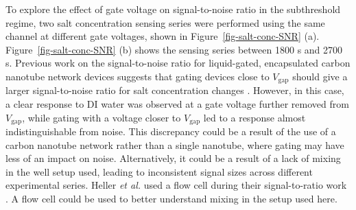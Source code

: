 \documentclass[
  a4paper,
]{scrbook}
\begin{document}
To explore the effect of gate voltage on signal-to-noise ratio in the
subthreshold regime, two salt concentration sensing series were
performed using the same channel at different gate voltages, shown in
Figure~\ref{fig-salt-conc-SNR} (a). Figure~\ref{fig-salt-conc-SNR} (b)
shows the sensing series between 1800 s and 2700 s. Previous work on the
signal-to-noise ratio for liquid-gated, encapsulated carbon nanotube
network devices suggests that gating devices close to
\(V_{\textrm{gap}}\) should give a larger signal-to-noise ratio for salt
concentration changes \autocite{Heller2009}. However, in this case, a
clear response to DI water was observed at a gate voltage further
removed from \(V_{\textrm{gap}}\), while gating with a voltage closer to
\(V_{\textrm{gap}}\) led to a response almost indistinguishable from
noise. This discrepancy could be a result of the use of a carbon
nanotube network rather than a single nanotube, where gating may have
less of an impact on noise. Alternatively, it could be a result of a
lack of mixing in the well setup used, leading to inconsistent signal
sizes across different experimental series. Heller \emph{et al.} used a
flow cell during their signal-to-ratio work \autocite{Heller2009}. A
flow cell could be used to better understand mixing in the setup used
here.
\end{document}
